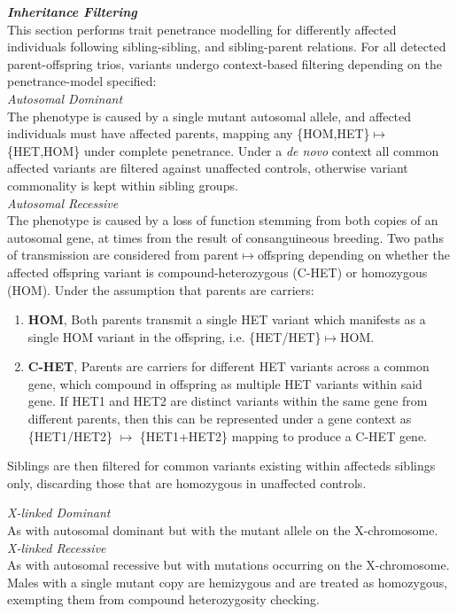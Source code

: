 \documentclass[twocolumn]{bmcart}%
\newcommand{\triplesub}[2]{\noindent\textsl{#1}\\#2\\}  %
\begin{document}
\triplesub{\bf Inheritance Filtering}{
This section performs trait penetrance modelling for differently affected individuals following sibling-sibling, and sibling-parent relations. For all detected parent-offspring trios, variants undergo context-based filtering depending on the penetrance-model specified:\\

	\triplesub{Autosomal Dominant}{The phenotype is caused by a single mutant autosomal allele, and affected individuals must have affected parents, mapping any \{HOM,HET\}$\mapsto$\{HET,HOM\} under complete penetrance. Under a \textit{de novo} context all common affected variants are filtered against unaffected controls, otherwise variant commonality is kept within sibling groups.}

	\triplesub{Autosomal Recessive}{
The phenotype is caused by a loss of function stemming from both copies of an autosomal gene, at times from the result of consanguineous breeding. Two paths of transmission are considered from parent$\mapsto$offspring depending on whether the affected offspring variant is compound-heterozygous (C-HET) or homozygous (HOM). Under the assumption that parents are carriers:\\
	\begin{enumerate}
\item{\bf HOM}{, Both parents transmit a single HET variant which manifests as a single HOM variant in the offspring, i.e. \{HET/HET\}$\mapsto$HOM.}
\item{\bf C-HET}{, Parents are carriers for different HET variants across a common gene, which compound in offspring as multiple HET variants within said gene. If HET1 and HET2 are distinct variants within the same gene from different parents, then this can be represented under a gene context as \{HET1/HET2\} $\mapsto$ \{HET1+HET2\} mapping to produce a C-HET gene.}
	\end{enumerate}
	\vspace{5pt}
Siblings are then filtered for common variants existing within affecteds siblings only, discarding those that are homozygous in unaffected controls.

	\triplesub{X-linked Dominant}{As with autosomal dominant but with the mutant allele on the X-chromosome.}
	
	\triplesub{X-linked Recessive}{As with autosomal recessive but with mutations occurring on the X-chromosome. Males with a single mutant copy are hemizygous and are treated as homozygous, exempting them from compound heterozygosity checking.}
	
}}
\end{document}
